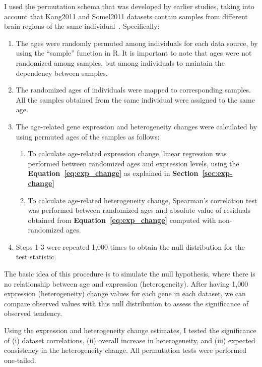 I used the permutation schema that was developed by earlier studies, 
taking into account that Kang2011 and Somel2011 datasets contain samples from different brain regions of the same individual~\autocite{Donertas2017, Donertas2018}.
Specifically: 

\begin{enumerate}
    \item The ages were randomly permuted among individuals for each data source, by using the ``sample'' function in R. 
    It is important to note that ages were not randomized among samples, but among individuals to maintain the dependency between samples.
    \item The randomized ages of individuals were mapped to corresponding samples. All the samples obtained from the same individual were assigned to the same age.
    \item The age-related gene expression and heterogeneity changes were calculated by using permuted ages of the samples as follows:
    \begin{enumerate}
        \item To calculate age-related expression change, linear regression was performed between randomized ages and expression levels, using the \textbf{Equation~\ref{eq:exp_change}} as explained in \textbf{Section~\ref{sec:exp-change}}
        \item To calculate age-related heterogeneity change, Spearman's correlation test was performed between randomized ages and absolute value of residuals obtained from \textbf{Equation~\ref{eq:exp_change}} computed with non-randomized ages.
    \end{enumerate} 
    \item Steps 1-3 were repeated 1,000 times to obtain the null distribution for the test statistic.
\end{enumerate}

The basic idea of this procedure is to simulate the null hypothesis, where there is no relationship between age and expression (heterogeneity).
After having 1,000 expression (heterogeneity) change values for each gene in each dataset, we can compare observed values with this null distribution
to assess the significance of observed tendency. 

Using the expression and heterogeneity change estimates, I tested the significance of 
(i) dataset correlations, (ii) overall increase in heterogeneity, and (iii) expected consistency in the heterogeneity change.
All permutation tests were performed one-tailed.

